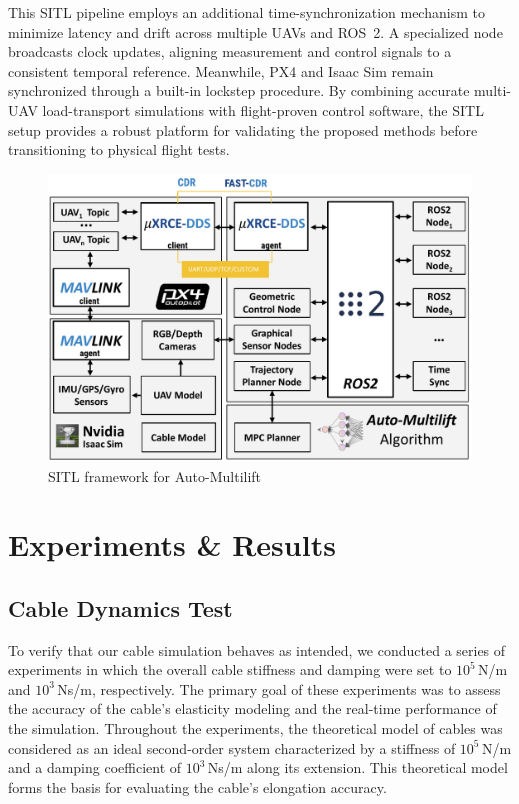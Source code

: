 \documentclass[12pt,twoside,letterpaper]{article}
\begin{document}
This SITL pipeline employs an additional time-synchronization mechanism to minimize latency and drift across multiple UAVs and ROS~2. A specialized node broadcasts clock updates, aligning measurement and control signals to a consistent temporal reference. Meanwhile, PX4 and Isaac Sim remain synchronized through a built-in lockstep procedure. By combining accurate multi-UAV load-transport simulations with flight-proven control software, the SITL setup provides a robust platform for validating the proposed methods before transitioning to physical flight tests.

\begin{figure}
    \centering
    \includegraphics[width=\linewidth]{figures/sys3.pdf}
    \caption{SITL framework for Auto-Multilift}
    \label{fig:sys_implement}
\end{figure}


\newpage
\section{Experiments \& Results}
\subsection{Cable Dynamics Test}
To verify that our cable simulation behaves as intended, we conducted a series of experiments in which the overall cable stiffness and damping were set to \(10^5\)\,N/m and \(10^3\)\,Ns/m, respectively.
The primary goal of these experiments was to assess the accuracy of the cable’s elasticity modeling and the real-time performance of the simulation.
Throughout the experiments, the theoretical model of cables was considered as an ideal second-order system characterized by a stiffness of \(10^5\)\,N/m and a damping coefficient of \(10^3\)\,Ns/m along its extension.
This theoretical model forms the basis for evaluating the cable’s elongation accuracy.
\end{document}
